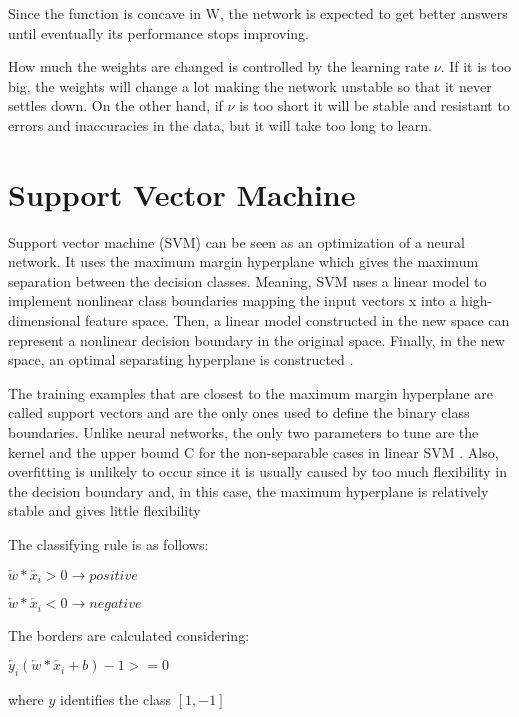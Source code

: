 Since the function is concave in W, the network is expected to get better answers until eventually its performance stops improving.

How much the weights are changed is controlled by the learning rate $\nu$. If it is too big, the weights will change a lot  making the network unstable so that it never settles down. On the other hand, if $\nu$ is too short it will be stable and resistant to errors and inaccuracies in the data, but it will take too long to learn. 


\section{Support Vector Machine}
Support vector machine (SVM) can be seen as an optimization of a neural network. It uses the maximum margin hyperplane which gives the maximum separation between the decision classes. Meaning, SVM uses a linear model to implement nonlinear class boundaries mapping the input vectors x into a high-dimensional feature space. Then, a linear model constructed in the new space can represent a nonlinear decision boundary in the original space. Finally, in the new space, an optimal separating hyperplane is constructed \cite{kim2003financial}. 

The training examples that are closest to the maximum margin hyperplane are called support vectors and are the only ones used to define the binary class boundaries. Unlike neural networks, the only two parameters to tune are the kernel and the upper bound C for the non-separable cases in linear SVM \cite{drucker1999support}. Also, overfitting is unlikely to occur since it is usually caused by too much flexibility in the decision boundary and, in this case, the maximum hyperplane is relatively stable and gives little flexibility \cite{zhang1998forecasting}

The classifying rule is as follows:

\centerline{$\overleftarrow{w} * \overleftarrow{x_i} > 0  \rightarrow  positive $ \\}
\centerline{$\overleftarrow{w} * \overleftarrow{x_i} < 0  \rightarrow  negative $\\} 

The borders are calculated considering: \\
\centerline{ $\overleftarrow{y_i} (\overleftarrow{w}*\overleftarrow{x_i}+b)-1>=0$ \\}
where $y$ identifies the class $[1,-1]$\\

